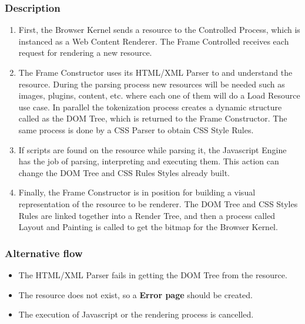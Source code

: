 \documentclass{sig-alternate-05-2015}
\begin{document}
    \subsubsection*{Description}
      \begin{enumerate}
        \item First, the Browser Kernel sends a resource to the Controlled Process, which is instanced as a Web Content Renderer. The Frame Controlled receives each request for rendering a new resource.
        \item The Frame Constructor uses its HTML/XML Parser to and understand the resource. During the parsing process new resources will be needed such as images, plugins, content, etc. where each one of them will do a Load Resource use case. In parallel the tokenization process creates a dynamic structure called as the DOM Tree, which is returned to the Frame Constructor. The same process is done by a CSS Parser to obtain CSS Style Rules.
        \item If scripts are found on the resource while parsing it, the Javascript Engine has the job of parsing, interpreting and executing them. This action can change the DOM Tree and CSS Rules Styles already built.
        \item Finally, the Frame Constructor is in position for building a visual representation of the resource to be renderer. The DOM Tree and CSS Styles Rules are linked together into a Render Tree, and then a process called Layout and Painting is called to get the bitmap for the Browser Kernel.
      \end{enumerate}
    \subsubsection*{Alternative flow} 
    \begin{itemize}
    \item The HTML/XML Parser fails in getting the DOM Tree from the resource.
    \item The resource does not exist, so a \textbf{Error page} should be created. 
    \item The execution of Javascript or the rendering process is cancelled.
      \end{itemize}
\end{document}
